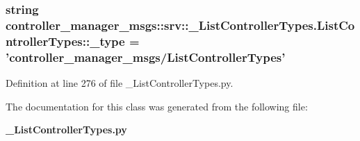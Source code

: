 \subsubsection[{\-\_\-type}]{\setlength{\rightskip}{0pt plus 5cm}string {\bf controller\-\_\-manager\-\_\-msgs\-::srv\-::\-\_\-\-List\-Controller\-Types.\-List\-Controller\-Types\-::\-\_\-type} = 'controller\-\_\-manager\-\_\-msgs/{\bf \-List\-Controller\-Types}'\hspace{0.3cm}{\ttfamily  [static, private]}}\label{classcontroller__manager__msgs_1_1srv_1_1__ListControllerTypes_1_1ListControllerTypes_a5137348076daaa19bc6f6d8580f3aa0a}


\-Definition at line 276 of file \-\_\-\-List\-Controller\-Types.\-py.



\-The documentation for this class was generated from the following file\-:\begin{DoxyCompactItemize}
\item 
{\bf \-\_\-\-List\-Controller\-Types.\-py}\end{DoxyCompactItemize}

